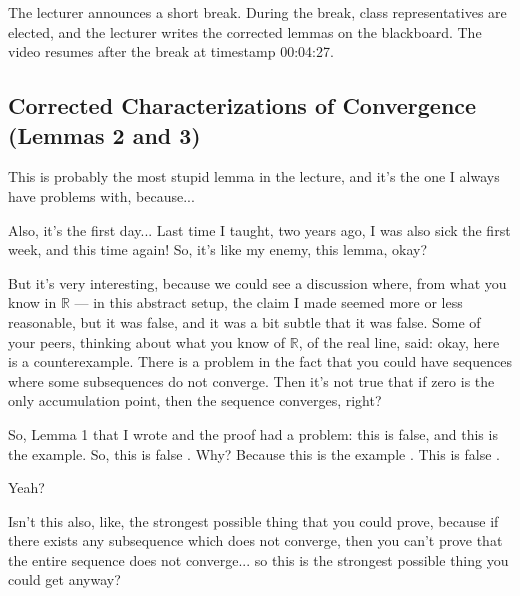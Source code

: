 \begin{pause}
The lecturer announces a short break. During the break, class representatives are elected, and the lecturer writes the corrected lemmas on the blackboard. The video resumes after the break at timestamp 00:04:27.
\end{pause}

\subsection{Corrected Characterizations of Convergence (Lemmas 2 and 3)}

\begin{speech}[00:42:38 - 00:44:28]
This is probably the most stupid lemma in the lecture, and it's the one I always have problems with, because... 

Also, it's the first day... Last time I taught, two years ago, I was also sick the first week, and this time again! So, it's like my enemy, this lemma, okay? 

But it's very interesting, because we could see a discussion where, from what you know in $\mathbb{R}$ --- in this abstract setup, the claim I made seemed more or less reasonable, but it was false, and it was a bit subtle that it was false. Some of your peers, thinking about what you know of $\mathbb{R}$, of the real line, said: okay, here is a counterexample. There is a problem in the fact that you could have sequences where some subsequences do not converge. Then it's not true that if zero is the only accumulation point, then the sequence converges, right?

So, Lemma 1 that I wrote and the proof had a problem: this is false, and this is the example. So, this is false . Why? Because this is the example . This is false .

Yeah?
\end{speech}

\begin{student}
Isn't this also, like, the strongest possible thing that you could prove, because if there exists any subsequence which does not converge, then you can't prove that the entire sequence does not converge... so this is the strongest possible thing you could get anyway?
\end{student}

